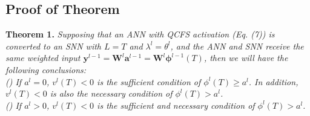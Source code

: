 \documentclass[letterpaper]{article} %
\begin{document}
\subsection{Proof of Theorem}


\textbf{Theorem 1.} {\it Supposing that an ANN with QCFS activation (Eq. (7)) is converted to an SNN with $L=T$ and $\lambda^l={\theta}^l$, and the ANN and SNN receive the same weighted input $\boldsymbol{y}^{l-1} = \boldsymbol{W}^{l} \boldsymbol{a}^{l-1}= \boldsymbol{W}^{l}\boldsymbol{\phi}^{l-1}(T)$,
 then we will have the following conclusions:\\
() If ${a}^l=0$, ${v}^l(T)<0$ is the sufficient condition of $\phi^l(T) \geqslant{a}^l$. In addition, ${v}^l(T)<0$ is also the necessary condition of $\phi^l(T)>{a}^l$.\\ 
() If ${a}^l>0$, ${v}^l(T)<0$ is the sufficient and necessary condition of $\phi^l(T)>{a}^l$.}
\end{document}
